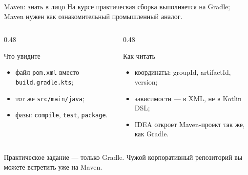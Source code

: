 \begin{frame}{Maven: знать в лицо}
   На курсе практическая сборка выполняется
  на Gradle; Maven нужен как ознакомительный промышленный аналог.

  \medskip
  \begin{columns}[T]
    \begin{column}{0.48\textwidth}
      \begin{block}{Что увидите}
        \begin{itemize}
          \item файл \texttt{pom.xml} вместо \texttt{build.gradle.kts};
          \item тот же \texttt{src/main/java};
          \item фазы: \texttt{compile}, \texttt{test}, \texttt{package}.
        \end{itemize}
      \end{block}
    \end{column}
    \begin{column}{0.48\textwidth}
      \begin{block}{Как читать}
        \begin{itemize}
          \item координаты: groupId, artifactId, version;
          \item зависимости --- в XML, не в Kotlin DSL;
          \item IDEA откроет Maven-проект так же, как Gradle.
        \end{itemize}
      \end{block}
    \end{column}
  \end{columns}

  \vspace{0.4em}
  {\footnotesize\color{acGray}
  Практическое задание --- только Gradle. Чужой корпоративный репозиторий
  вы можете встретить уже на Maven.}
\end{frame}
